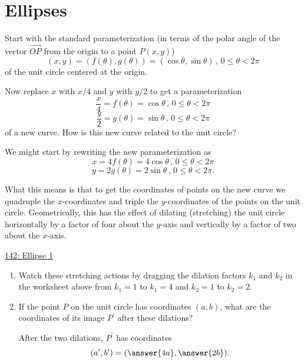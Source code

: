 \documentclass{ximera}
\begin{document}
\section{Ellipses}
\begin{example} \label{Ex:DFDrefdfobbzx}
Start with the standard parameterization (in terms of the polar angle of the vector $\overrightarrow{OP}$ from the origin to a point $P(x,y)$)
\[
    (x,y) = (f(\theta) , g(\theta)) =   ( \cos \theta , \sin \theta ) \, , \, 0\leq\theta < 2\pi 
\]
of the unit circle centered at the origin.

Now replace $x$ with $x/4$ and $y$ with $y/2$ to get a parameterization
\[
  \frac{x}{4} = f(\theta) = \cos\theta \, , \, 0\leq\theta < 2\pi 
\]
\[
  \frac{y}{2} = g(\theta) = \sin \theta \, , \, 0\leq\theta < 2\pi 
\]
of a new curve. How is this new curve related to the unit circle?

We might start by rewriting the new parameterization as
\[
      x = 4 f(\theta) = 4\cos\theta \, , \, 0\leq\theta < 2\pi 
\]
\[ 
   y = 2 g(\theta) = 2\sin \theta \, , \, 0\leq\theta < 2\pi .
\]

What this means is that to get the coordinates of points on the new curve we quadruple the $x$-coordinates and triple the $y$-coordinates of the points on the unit circle. Geometrically, this has the effect of dilating (stretching) the unit circle horizontally by a factor of four about the $y$-axis and vertically by a factor of two about the $x$-axis. 


\begin{onlineOnly}
    \begin{center}
\end{center}
\end{onlineOnly}

\href{https://www.desmos.com/calculator/3ibj708prx}{142: Ellipse 1}

\begin{enumerate}
\item Watch these stretching actions by dragging the dilation factors $k_1$ and $k_2$ in the worksheet above from $k_1=1$ to $k_1=4$ and $k_2=1$ to $k_2 = 2$.

\item If the point $P$ on the unit circle has coordinates $(a,b)$, what are the coordinates of its image $P^\prime$ after these dilations?

After the two dilations, $P^\prime$ has coordinates
\[
    (a^\prime, b^\prime) = (  \answer{4a} , \answer{2b} ) .
\]


\end{enumerate}
\end{example}
\end{document}
